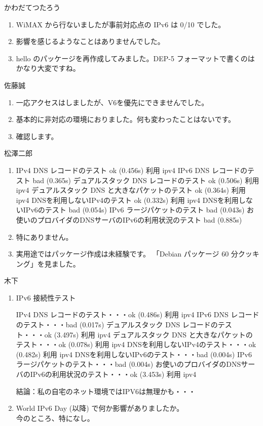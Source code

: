 \documentclass[mingoth,a4paper]{jsarticle}
\begin{document}
\begin{prework}{ かわだてつたろう }
  \begin{enumerate}
  \item WiMAX から行ないましたが事前対応点の IPv6 は 0/10 でした。
  \item 影響を感じるようなことはありませんでした。
  \item hello のパッケージを再作成してみました。DEP-5 フォーマットで書くのはかなり大変ですね。
  \end{enumerate}
\end{prework}

\begin{prework}{ 佐藤誠 }
  \begin{enumerate}
  \item 一応アクセスはしましたが、V6を優先にできませんでした。
  \item 基本的に非対応の環境におりました。何も変わったことはないです。
  \item 確認します。
  \end{enumerate}
\end{prework}

\begin{prework}{ 松澤二郎 }
  \begin{enumerate}
  \item
\begin{commandline}
IPv4 DNS レコードのテスト
ok (0.456s) 利用 ipv4
IPv6 DNS レコードのテスト
bad (0.365s)
デュアルスタック DNS レコードのテスト
ok (0.506s) 利用 ipv4
デュアルスタック DNS と大きなパケットのテスト
ok (0.364s) 利用 ipv4
DNSを利用しないIPv4のテスト
ok (0.332s) 利用 ipv4
DNSを利用しないIPv6のテスト
bad (0.054s)
IPv6 ラージパケットのテスト
bad (0.043s)
お使いのプロバイダのDNSサーバのIPv6の利用状況のテスト
bad (0.885s)
\end{commandline}
  \item 特にありません。
  \item
    実用途ではパッケージ作成は未経験です。
    「Debian パッケージ 60 分クッキング」を見ました。
  \end{enumerate}
\end{prework}

\begin{prework}{ 木下 }
  \begin{enumerate}
  \item IPv6 接続性テスト
\begin{commandline}
IPv4 DNS レコードのテスト・・・ok (0.486s) 利用 ipv4
IPv6 DNS レコードのテスト・・・bad (0.017s)
デュアルスタック DNS レコードのテスト・・・ok (3.497s) 利用 ipv4
デュアルスタック DNS と大きなパケットのテスト・・・ok (0.078s) 利用 ipv4
DNSを利用しないIPv4のテスト・・・ok (0.482s) 利用 ipv4
DNSを利用しないIPv6のテスト・・・bad (0.004s)
IPv6 ラージパケットのテスト・・・bad (0.004s)
お使いのプロバイダのDNSサーバのIPv6の利用状況のテスト・・・ok (3.453s) 利用 ipv4
\end{commandline}
    結論：私の自宅のネット環境ではIPV6は無理かも・・・
  \item World IPv6 Day (以降) で何か影響がありましたか。\\
    今のところ、特になし。
  \end{enumerate}
\end{prework}
\end{document}
